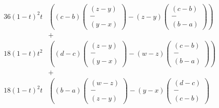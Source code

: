 \documentclass{article}
\theoremstyle{mytheoremstyle}
\theoremstyle{mytheoremstyle}
\theoremstyle{myproblemstyle}
\begin{document}
\begin{align*}
{{{\begin{aligned}
                36{(1-t)}^2t&\left(
                    (c - b)
                    \left(\begin{gathered}
                        (z - y)
                        \\-\\
                        (y - x)
                    \end{gathered}\right)
                    -
                    (z - y)
                    \left(\begin{gathered}
                        (c - b)
                        \\-\\
                        (b - a)
                    \end{gathered}\right)
                \right)
                \\&+\\
                18(1-t)t^2&\left(
                    (d - c)
                    \left(\begin{gathered}
                        (z - y)
                        \\-\\
                        (y - x)
                    \end{gathered}\right)
                    -
                    (w - z)
                    \left(\begin{gathered}
                        (c - b)
                        \\-\\
                        (b - a)
                    \end{gathered}\right)
                \right)
                \\&+\\
                18{(1-t)}^2t&\left(
                    (b - a)
                    \left(\begin{gathered}
                        (w - z)
                        \\-\\
                        (z - y)
                    \end{gathered}\right)
                    -
                    (y - x)
                    \left(\begin{gathered}
                        (d - c)
                        \\-\\
                        (c - b)
                    \end{gathered}\right)

\end{aligned}}}}
\end{align*}
\end{document}
